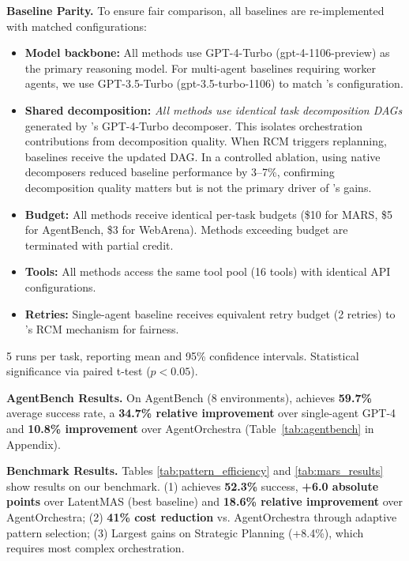 \documentclass{article}
\theoremstyle{plain}
\theoremstyle{definition}
\theoremstyle{remark}
\begin{document}
\textbf{Baseline Parity.} To ensure fair comparison, all baselines are re-implemented with matched configurations:
\begin{itemize}[nosep,leftmargin=*]
	\item \textbf{Model backbone:} All methods use GPT-4-Turbo (gpt-4-1106-preview) as the primary reasoning model. For multi-agent baselines requiring worker agents, we use GPT-3.5-Turbo (gpt-3.5-turbo-1106) to match \amore{}'s configuration.
	\item \textbf{Shared decomposition:} \textit{All methods use identical task decomposition DAGs} generated by \amore{}'s GPT-4-Turbo decomposer. This isolates orchestration contributions from decomposition quality. When RCM triggers replanning, baselines receive the updated DAG. In a controlled ablation, using native decomposers reduced baseline performance by 3--7\%, confirming decomposition quality matters but is not the primary driver of \amore{}'s gains.
	\item \textbf{Budget:} All methods receive identical per-task budgets (\$10 for MARS, \$5 for AgentBench, \$3 for WebArena). Methods exceeding budget are terminated with partial credit.
	\item \textbf{Tools:} All methods access the same tool pool (16 tools) with identical API configurations.
	\item \textbf{Retries:} Single-agent baseline receives equivalent retry budget (2 retries) to \amore{}'s RCM mechanism for fairness.
\end{itemize}

5 runs per task, reporting mean and 95\% confidence intervals. Statistical significance via paired t-test ($p < 0.05$).


\textbf{AgentBench Results.}
On AgentBench (8 environments), \amore{} achieves \textbf{59.7\%} average success rate, a \textbf{34.7\% relative improvement} over single-agent GPT-4 and \textbf{10.8\% improvement} over AgentOrchestra (Table~\ref{tab:agentbench} in Appendix).

\textbf{\mars{} Benchmark Results.}
Tables \ref{tab:pattern_efficiency} and \ref{tab:mars_results} show results on our \mars{} benchmark. (1) \amore{} achieves \textbf{52.3\%} success, \textbf{+6.0 absolute points} over LatentMAS (best baseline) and \textbf{18.6\% relative improvement} over AgentOrchestra; (2) \textbf{41\% cost reduction} vs. AgentOrchestra through adaptive pattern selection; (3) Largest gains on Strategic Planning (+8.4\%), which requires most complex orchestration.
\end{document}
